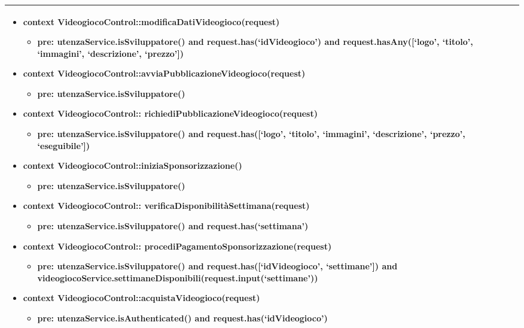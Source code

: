 \begin{tabular}{|| l | p{28.5em} ||}
\begin{itemize}[leftmargin=*]
	\item \textbf{context} VideogiocoControl::modificaDatiVideogioco(request)
	\begin{itemize}
		\item[ ] \textbf{pre:} utenzaService.isSviluppatore() and request.has(‘idVideogioco’) and request.hasAny([‘logo’, ‘titolo’, ‘immagini’, ‘descrizione’, ‘prezzo’]) 
	\end{itemize}

	\item \textbf{context} VideogiocoControl::avviaPubblicazioneVideogioco(request)
	\begin{itemize}
		\item[ ] \textbf{pre:} utenzaService.isSviluppatore()
	\end{itemize} 
  
	\item \textbf{context} VideogiocoControl::\newline
	richiediPubblicazioneVideogioco(request)
	\begin{itemize}
		\item[ ] \textbf{pre:} utenzaService.isSviluppatore() and request.has([‘logo’, ‘titolo’, ‘immagini’, ‘descrizione’, ‘prezzo’, ‘eseguibile’])
	\end{itemize}

	\item \textbf{context} VideogiocoControl::iniziaSponsorizzazione()
	\begin{itemize}
		\item[ ] \textbf{pre:} utenzaService.isSviluppatore()
	\end{itemize}

	\item \textbf{context} VideogiocoControl::\newline
	verificaDisponibilitàSettimana(request)
	\begin{itemize}
		\item[ ] \textbf{pre:} utenzaService.isSviluppatore() and request.has(‘settimana’) 
	\end{itemize}
	
	\item \textbf{context} VideogiocoControl::\newline
	procediPagamentoSponsorizzazione(request)
	\begin{itemize}
		\item[ ] \textbf{pre:} utenzaService.isSviluppatore() and request.has([‘idVideogioco’, ‘settimane’]) and videogiocoService.settimaneDisponibili(request.input(‘settimane’))
	\end{itemize}

	\item \textbf{context} VideogiocoControl::acquistaVideogioco(request)
	\begin{itemize}
		\item[ ] \textbf{pre:} utenzaService.isAuthenticated() and request.has(‘idVideogioco’)
	\end{itemize}
\end{itemize}\\
\hline
\end{tabular}

